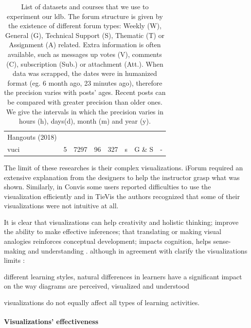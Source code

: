 \documentclass[a4paper,twoside]{article}
\begin{document}
\begin{table}[t]
\begin{tabular}{lllrrllp{}}
    Hangouts (2018) &  &  & \multicolumn{1}{l}{} & \multicolumn{1}{l}{} &  &  &  \\ [.2cm]
    \gls{vuci} & \multicolumn{1}{r}{5} & \multicolumn{1}{r}{7297} & 96 & 327 &  \multicolumn{1}{l}{s} & G \& S & -  \\   \bottomrule
  \end{tabular}
  \caption{\label{tab:datasets}List of datasets and courses that we use to experiment our \gls{ldb}.  The forum structure is given by the existence of different forum types: Weekly (W), General (G), Technical Support (S), Thematic (T) or Assignment (A) related.  Extra information is often available, such as messages up votes (V), comments (C), subscription (Sub.) or attachment (Att.).  When data was scrapped, the dates were in humanized format (eg. 6 month ago, 23 minutes ago), therefore the precision varies with posts' ages.  Recent posts can be compared with greater precision than older ones. We give the intervals in which the precision varies in hours (h), days(d), month (m) and year (y).}
\end{table}


The limit of these researches is their complex visualizations.  iForum required an extensive explanation from the designers to help the instructor grasp what was shown.  Similarly, in Convis some users reported difficulties to use the visualization efficiently and in TieVis the authors recognized that some of their visualizations were not intuitive at all.

It is clear that visualizations can help creativity and holistic thinking; improve the ability to make effective inferences; that translating or making visual analogies reinforces conceptual development; impacts cognition, helps sense-making and understanding \citep{Klerkx2014}.  \cite{Twissell2014} although in agreement with \cite{Klerkx2014} clarify the visualizations limits : 
\begin{inparaenum}
\item different learning styles, natural differences in learners have a significant impact on the way diagrams are perceived, visualized and understood
\item visualizations do not equally affect all types of learning activities.
\end{inparaenum}


\paragraph{Visualizations' effectiveness}
\end{document}
